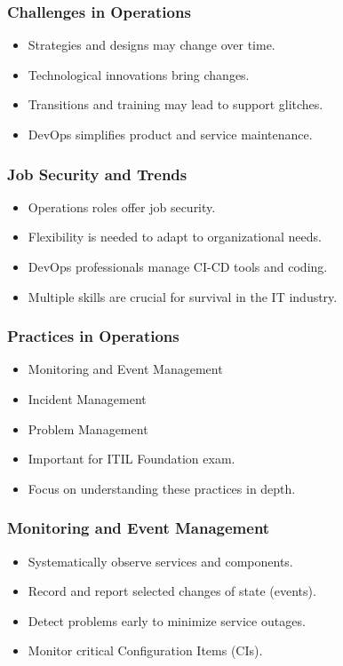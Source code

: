 \documentclass[aspectratio=169, table]{beamer}
\begin{document}
\begin{frame}
	\frametitle{Challenges in Operations}
	
	\begin{itemize}
		\item Strategies and designs may change over time.
		\item Technological innovations bring changes.
		\item Transitions and training may lead to support glitches.
		\item DevOps simplifies product and service maintenance.
	\end{itemize}
\end{frame}

\begin{frame}
	\frametitle{Job Security and Trends}
	
	\begin{itemize}
		\item Operations roles offer job security.
		\item Flexibility is needed to adapt to organizational needs.
		\item DevOps professionals manage CI-CD tools and coding.
		\item Multiple skills are crucial for survival in the IT industry.
	\end{itemize}
\end{frame}

\begin{frame}
	\frametitle{Practices in Operations}
	
	\begin{itemize}
		\item Monitoring and Event Management
		\item Incident Management
		\item Problem Management
		\item Important for ITIL Foundation exam.
		\item Focus on understanding these practices in depth.
	\end{itemize}
\end{frame}

\begin{frame}
	\frametitle{Monitoring and Event Management}
	
	\begin{itemize}
		\item Systematically observe services and components.
		\item Record and report selected changes of state (events).
		\item Detect problems early to minimize service outages.
		\item Monitor critical Configuration Items (CIs).
	\end{itemize}
\end{frame}
\end{document}

